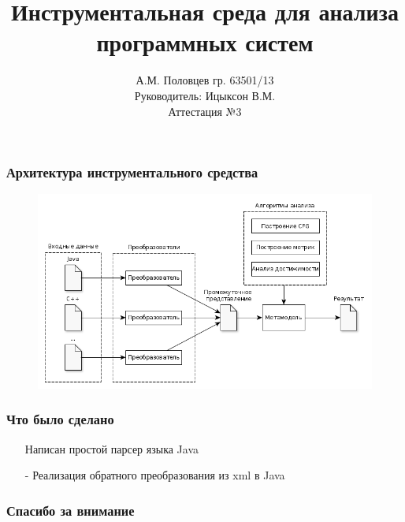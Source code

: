 \documentclass{beamer}
\title[Инструментальная среда]
{Инструментальная среда для анализа программных систем}
\author[А.М. Половцев]{
    А.М. Половцев гр. 63501/13\\
    Руководитель: Ицыксон В.М.\\
    Аттестация №3
}
\date[28.02.2013]{}
\begin{document}
\frame{\titlepage}

\begin{frame}
\frametitle{Архитектура инструментального средства}

\begin{figure}[h!]
    \begin{center}
        \includegraphics[width=\textwidth]{img/architecture.png}
    \end{center}
\end{figure}
\end{frame}

\begin{frame}
\frametitle{Что было сделано}
    \begin{itemize}
        \item[\checkmark] Написан простой парсер языка Java
        \item[-] Реализация обратного преобразования из xml в Java
    \end{itemize}
\end{frame}

\begin{frame}
\frametitle{Спасибо за внимание}
\end{frame}
\end{document}
